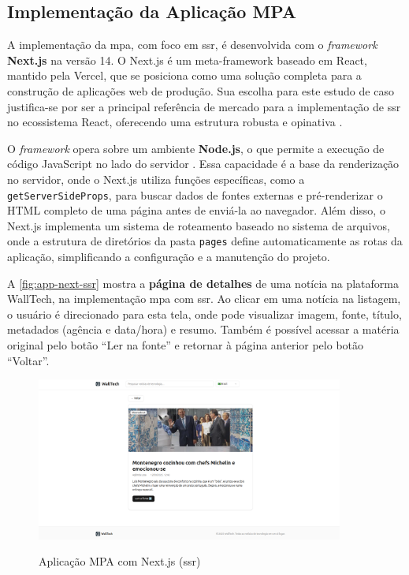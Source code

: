 \subsection{Implementação da Aplicação MPA}
\label{ssec:implementacao_mpa}

A implementação da \acrfull{mpa}, com foco em \acrfull{ssr}, é desenvolvida com o \emph{framework} \textbf{Next.js} na versão 14. O Next.js é um meta-framework baseado em React, mantido pela Vercel, que se posiciona como uma solução completa para a construção de aplicações web de produção. Sua escolha para este estudo de caso justifica-se por ser a principal referência de mercado para a implementação de \acrshort{ssr} no ecossistema React, oferecendo uma estrutura robusta e opinativa \cite{nextjs2024}.

O \emph{framework} opera sobre um ambiente \textbf{Node.js}, o que permite a execução de código JavaScript no lado do servidor \cite{nodejs2025}. Essa capacidade é a base da renderização no servidor, onde o Next.js utiliza funções específicas, como a \texttt{getServerSideProps}, para buscar dados de fontes externas e pré-renderizar o HTML completo de uma página antes de enviá-la ao navegador. Além disso, o Next.js implementa um sistema de roteamento baseado no sistema de arquivos, onde a estrutura de diretórios da pasta \texttt{pages} define automaticamente as rotas da aplicação, simplificando a configuração e a manutenção do projeto.


A \autoref{fig:app-next-ssr} mostra a \textbf{página de detalhes} de uma notícia na plataforma WallTech, na implementação \acrshort{mpa} com \acrshort{ssr}. Ao clicar em uma notícia na listagem, o usuário é direcionado para esta tela, onde pode visualizar imagem, fonte, título, metadados (agência e data/hora) e resumo. Também é possível acessar a matéria original pelo botão “Ler na fonte” e retornar à página anterior pelo botão “Voltar”.

\begin{figure}[H]
  \centering
  \caption{Aplicação MPA com Next.js (\acrshort{ssr})}
  \includegraphics[width=0.9\textwidth]{media/app_next_ssr.png}
  \label{fig:app-next-ssr}
\end{figure}


